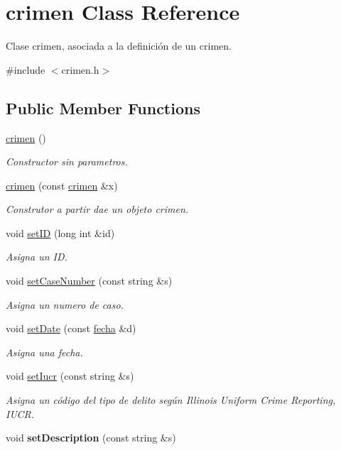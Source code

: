 \hypertarget{classcrimen}{}\section{crimen Class Reference}
\label{classcrimen}


Clase crimen, asociada a la definición de un crimen.  




{\ttfamily \#include $<$crimen.\+h$>$}

\subsection*{Public Member Functions}
\begin{DoxyCompactItemize}
\item 
\hypertarget{classcrimen_ab1147e36869c7e635699e4ef746a7555}{}\hyperlink{classcrimen_ab1147e36869c7e635699e4ef746a7555}{crimen} ()\label{classcrimen_ab1147e36869c7e635699e4ef746a7555}

\begin{DoxyCompactList}\small\item\em Constructor sin parametros. \end{DoxyCompactList}\item 
\hyperlink{classcrimen_a50b783e821c2f5bc829eceb9048c12d7}{crimen} (const \hyperlink{classcrimen}{crimen} \&x)
\begin{DoxyCompactList}\small\item\em Construtor a partir dae un objeto crimen. \end{DoxyCompactList}\item 
void \hyperlink{classcrimen_a2675734f5049f41b5fb5dbc4778df7f8}{set\+I\+D} (long int \&id)
\begin{DoxyCompactList}\small\item\em Asigna un I\+D. \end{DoxyCompactList}\item 
void \hyperlink{classcrimen_a98ee8c42a0ec09c704c5f17e812a6bd5}{set\+Case\+Number} (const string \&s)
\begin{DoxyCompactList}\small\item\em Asigna un numero de caso. \end{DoxyCompactList}\item 
void \hyperlink{classcrimen_ac308c139bb8b599a7badbecd91bfbc5a}{set\+Date} (const \hyperlink{classfecha}{fecha} \&d)
\begin{DoxyCompactList}\small\item\em Asigna una fecha. \end{DoxyCompactList}\item 
void \hyperlink{classcrimen_a9903f49178ad0001f39c03d018b05a2a}{set\+Iucr} (const string \&s)
\begin{DoxyCompactList}\small\item\em Asigna un código del tipo de delito según Illinois Uniform Crime Reporting, I\+U\+C\+R. \end{DoxyCompactList}\item 
\hypertarget{classcrimen_a49fdeeb1b6376fd78bce80e42f670d43}{}void {\bfseries set\+Description} (const string \&s)\label{classcrimen_a49fdeeb1b6376fd78bce80e42f670d43}


\end{DoxyCompactItemize}

